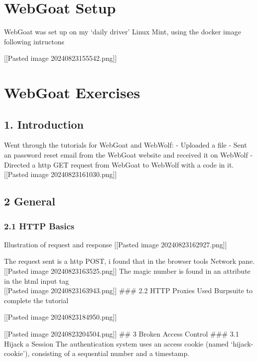 \hypertarget{webgoat-setup}{%
\section{WebGoat Setup}\label{webgoat-setup}}

WebGoat was set up on my `daily driver' Linux Mint, using the docker
image following intructons

{[}{[}Pasted image 20240823155542.png{]}{]}

\hypertarget{webgoat-exercises}{%
\section{WebGoat Exercises}\label{webgoat-exercises}}

\hypertarget{introduction}{%
\subsection{1. Introduction}\label{introduction}}

Went through the tutorials for WebGoat and WebWolf: - Uploaded a file -
Sent an password reset email from the WebGoat website and received it on
WebWolf - Directed a http GET request from WebGoat to WebWolf with a
code in it. {[}{[}Pasted image 20240823161030.png{]}{]}

\hypertarget{general}{%
\subsection{2 General}\label{general}}

\hypertarget{http-basics}{%
\subsubsection{2.1 HTTP Basics}\label{http-basics}}

Illustration of request and response {[}{[}Pasted image
20240823162927.png{]}{]}

The request sent is a http POST, i found that in the browser tools
Network pane. {[}{[}Pasted image 20240823163525.png{]}{]} The magic
number is found in an attribute in the html input tag\\
{[}{[}Pasted image 20240823163943.png{]}{]} \#\#\# 2.2 HTTP Proxies Used
Burpsuite to complete the tutorial

{[}{[}Pasted image 20240823184950.png{]}{]}

{[}{[}Pasted image 20240823204504.png{]}{]} \#\# 3 Broken Access Control
\#\#\# 3.1 Hijack a Session The authentication system uses an access
cookie (named `hijack-cookie'), consisting of a sequential number and a
timestamp.

